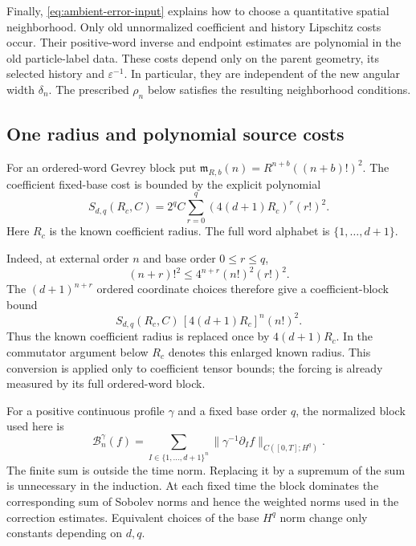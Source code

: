 Finally, \eqref{eq:ambient-error-input} explains how to choose a
quantitative spatial neighborhood. Only old unnormalized coefficient
and history Lipschitz costs occur. Their positive-word inverse and
endpoint estimates are polynomial in the old particle-label data.
These costs depend only on the parent geometry, its selected history
and $\varepsilon^{-1}$. In particular, they are independent of the new
angular width $\delta_n$. The prescribed $\rho_n$ below satisfies
the resulting neighborhood conditions.

\subsection{One radius and polynomial source costs}

For an ordered-word Gevrey block put
$\mathfrak m_{R,b}(n)=R^{n+b}((n+b)!)^2$. The coefficient fixed-base
cost is bounded by the explicit polynomial
\[
 S_{d,q}(R_c,C)=2^q C\sum_{r=0}^q(4(d+1)R_c)^r(r!)^2.
\]
Here $R_c$ is the known coefficient radius. The full word alphabet is
$\{1,\ldots,d+1\}$.

Indeed, at external order $n$ and base order $0\leq r\leq q$,
\[
 (n+r)!^2\leq4^{n+r}(n!)^2(r!)^2.
\]
The $(d+1)^{n+r}$ ordered coordinate choices therefore give a
coefficient-block bound
\[
 S_{d,q}(R_c,C)\,[4(d+1)R_c]^n(n!)^2.
\]
Thus the known coefficient radius is replaced once by
$4(d+1)R_c$. In the commutator argument below $R_c$ denotes this
enlarged known radius. This conversion is applied only to coefficient
tensor bounds; the forcing is already measured by its full ordered-word
block.

For a positive continuous profile $\gamma$ and a fixed base order $q$,
the normalized block used here is
\[
 \mathcal B_n^\gamma(f)=
 \sum_{I\in\{1,\ldots,d+1\}^{n}}
 \bigl\|\gamma^{-1}\partial_I f\bigr\|_{C([0,T];H^q)}.
\]
The finite sum is outside the time norm. Replacing it by a supremum of
the sum is unnecessary in the induction. At each fixed time the block
dominates the corresponding sum of Sobolev norms and hence the
weighted norms used in the correction estimates. Equivalent choices
of the base $H^q$ norm change only constants depending on $d,q$.

